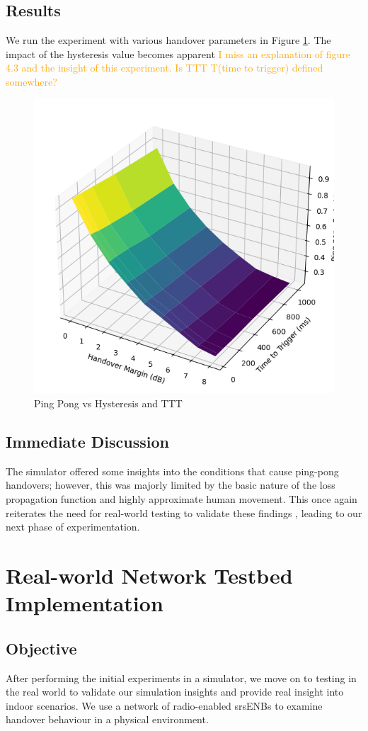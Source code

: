 \subsection{Results}
We run the experiment with various handover parameters in Figure \ref{fig:methods:pingpong-uesim}. The impact of the hysteresis value becomes apparent  \textcolor{orange}{I miss an explanation of figure 4.3 and the insight of this experiment. Is TTT T(time to trigger) defined somewhere?}
\begin{figure}
    \centering
    \includegraphics[width=0.5\linewidth]{src//img/pingpong_uesim.png}
    \caption{Ping Pong vs Hysteresis and TTT}
    \label{fig:methods:pingpong-uesim}
\end{figure}
\subsection{Immediate Discussion}
The simulator offered some insights into the conditions that cause ping-pong handovers; however, this was majorly limited by the basic nature of the loss propagation function and highly approximate human movement. This once again reiterates the need for real-world testing to validate these findings , leading to our next phase of experimentation.


\section{Real-world Network Testbed Implementation}

\subsection{Objective}
After performing the initial experiments in a simulator, we move on to testing in the real world to validate our simulation insights and provide real insight into indoor scenarios. We use a network of radio-enabled srsENBs to examine handover behaviour in a physical environment.

